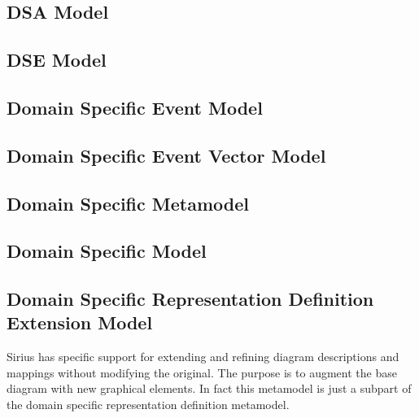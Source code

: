 \documentclass{gemoc} %
\begin{document}

\subsection{DSA Model}
\label{sec:DSA_Model}


\subsection{DSE Model}
\label{sec:DSE_Model}


\subsection{Domain Specific Event Model}
\label{sec:Domain_Specific_Event_Model}


\subsection{Domain Specific Event Vector Model}
\label{sec:Domain_Specific_Event_Vector_Model}


\subsection{Domain Specific Metamodel}
\label{sec:Domain_Specific_Metamodel}


\subsection{Domain Specific Model}
\label{sec:Domain_Specific_Model}


\subsection{Domain Specific Representation Definition Extension Model}
\label{sec:Domain_Specific_Representation_Definition_Extension_Model}
Sirius has specific support for extending and refining diagram descriptions and mappings without modifying the original. The purpose is to augment the base diagram with new graphical elements. In fact this metamodel is just a subpart of the domain specific representation definition metamodel.
\end{document}
